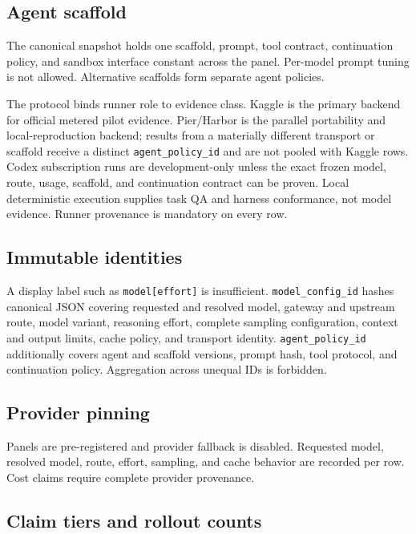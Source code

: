 \documentclass[11pt]{article}
\begin{document}
\subsection{Agent scaffold}\hypertarget{101-agent-scaffold}{}\label{101-agent-scaffold}

The canonical snapshot holds one scaffold, prompt, tool contract, continuation policy, and sandbox interface constant across the panel. Per-model prompt tuning is not allowed. Alternative scaffolds form separate agent policies.

The protocol binds runner role to evidence class. Kaggle is the primary backend for official metered pilot evidence. Pier/Harbor is the parallel portability and local-reproduction backend; results from a materially different transport or scaffold receive a distinct \texttt{agent\_policy\_id} and are not pooled with Kaggle rows. Codex subscription runs are development-only unless the exact frozen model, route, usage, scaffold, and continuation contract can be proven. Local deterministic execution supplies task QA and harness conformance, not model evidence. Runner provenance is mandatory on every row.

\subsection{Immutable identities}\hypertarget{102-immutable-identities}{}\label{102-immutable-identities}

A display label such as \texttt{model{[}effort{]}} is insufficient. \texttt{model\_config\_id} hashes canonical JSON covering requested and resolved model, gateway and upstream route, model variant, reasoning effort, complete sampling configuration, context and output limits, cache policy, and transport identity. \texttt{agent\_policy\_id} additionally covers agent and scaffold versions, prompt hash, tool protocol, and continuation policy. Aggregation across unequal IDs is forbidden.

\subsection{Provider pinning}\hypertarget{103-provider-pinning}{}\label{103-provider-pinning}

Panels are pre-registered and provider fallback is disabled. Requested model, resolved model, route, effort, sampling, and cache behavior are recorded per row. Cost claims require complete provider provenance.

\subsection{Claim tiers and rollout counts}\hypertarget{104-claim-tiers-and-rollout-counts}{}\label{104-claim-tiers-and-rollout-counts}
\end{document}
